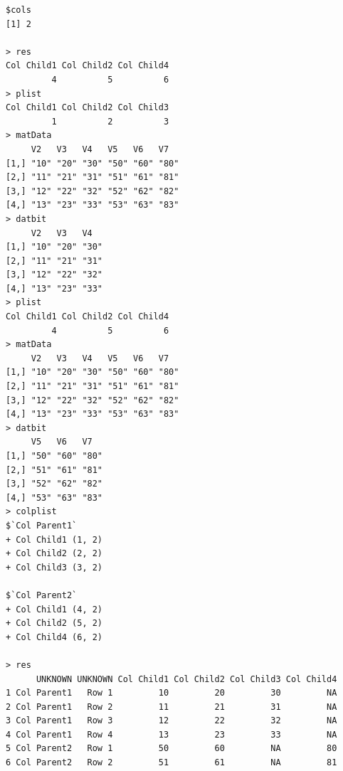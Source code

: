 \documentclass[a4paper]{article}
\begin{document}
\begin{verbatim}
$cols
[1] 2

> res 
Col Child1 Col Child2 Col Child4 
         4          5          6 
> plist 
Col Child1 Col Child2 Col Child3 
         1          2          3 
> matData 
     V2   V3   V4   V5   V6   V7  
[1,] "10" "20" "30" "50" "60" "80"
[2,] "11" "21" "31" "51" "61" "81"
[3,] "12" "22" "32" "52" "62" "82"
[4,] "13" "23" "33" "53" "63" "83"
> datbit 
     V2   V3   V4  
[1,] "10" "20" "30"
[2,] "11" "21" "31"
[3,] "12" "22" "32"
[4,] "13" "23" "33"
> plist 
Col Child1 Col Child2 Col Child4 
         4          5          6 
> matData 
     V2   V3   V4   V5   V6   V7  
[1,] "10" "20" "30" "50" "60" "80"
[2,] "11" "21" "31" "51" "61" "81"
[3,] "12" "22" "32" "52" "62" "82"
[4,] "13" "23" "33" "53" "63" "83"
> datbit 
     V5   V6   V7  
[1,] "50" "60" "80"
[2,] "51" "61" "81"
[3,] "52" "62" "82"
[4,] "53" "63" "83"
> colplist 
$`Col Parent1`
+ Col Child1 (1, 2)
+ Col Child2 (2, 2)
+ Col Child3 (3, 2)

$`Col Parent2`
+ Col Child1 (4, 2)
+ Col Child2 (5, 2)
+ Col Child4 (6, 2)

> res 
      UNKNOWN UNKNOWN Col Child1 Col Child2 Col Child3 Col Child4
1 Col Parent1   Row 1         10         20         30         NA
2 Col Parent1   Row 2         11         21         31         NA
3 Col Parent1   Row 3         12         22         32         NA
4 Col Parent1   Row 4         13         23         33         NA
5 Col Parent2   Row 1         50         60         NA         80
6 Col Parent2   Row 2         51         61         NA         81
\end{verbatim}

\newpage
\end{document}
